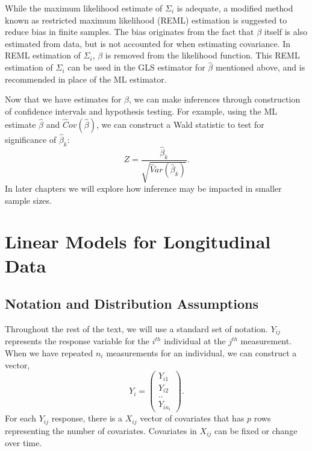 \documentclass[12pt, twoside]{amherstthesis}
\begin{document}
While the maximum likelihood estimate of \(\Sigma_i\) is adequate, a modified method known as restricted maximum likelihood (REML) estimation is suggested to reduce bias in finite samples. The bias originates from the fact that \(\beta\) itself is also estimated from data, but is not accounted for when estimating covariance. In REML estimation of \(\Sigma_i\), \(\beta\) is removed from the likelihood function. This REML estimation of \(\Sigma_i\) can be used in the GLS estimator for \(\hat\beta\) mentioned above, and is recommended in place of the ML estimator.

Now that we have estimates for \(\beta\), we can make inferences through construction of confidence intervals and hypothesis testing. For example, using the ML estimate \(\hat\beta\) and \(\hat Cov(\hat\beta)\), we can construct a Wald statistic to test for significance of \(\hat \beta_k\):
\[Z = \frac{\hat \beta_k}{\sqrt{\hat Var(\hat \beta_k)}}.\] In later chapters we will explore how inference may be impacted in smaller sample sizes.

\hypertarget{linear-models-for-longitudinal-data}{%
\section{Linear Models for Longitudinal Data}\label{linear-models-for-longitudinal-data}}

\hypertarget{notation-and-distribution-assumptions}{%
\subsection{Notation and Distribution Assumptions}\label{notation-and-distribution-assumptions}}

Throughout the rest of the text, we will use a standard set of notation. \(Y_{ij}\) represents the response variable for the \(i^{th}\) individual at the \(j^{th}\) measurement. When we have repeated \(n_i\) measurements for an individual, we can construct a vector, \[Y_i = \begin{pmatrix} Y_{i1}\\ Y_{i2} \\ .. \\  Y_{in_i}  \end{pmatrix}.\] For each \(Y_{ij}\) response, there is a \(X_{ij}\) vector of covariates that has \(p\) rows representing the number of covariates. Covariates in \(X_{ij}\) can be fixed or change over time.
\end{document}
